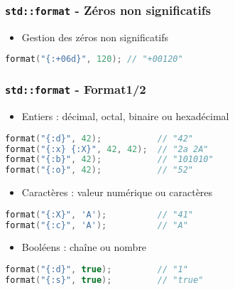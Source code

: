 \documentclass[C++.tex]{subfiles}
\begin{document}
\begin{frame}[fragile]
	\frametitle{\lstinline|std::format| - Zéros non significatifs}
	\begin{itemize}
		\item Gestion des zéros non significatifs
	\end{itemize}

	\begin{lstlisting}[language=C++]
format("{:+06d}", 120);	// "+00120"\end{lstlisting}
\end{frame}

\begin{frame}[fragile]
	\frametitle{\lstinline|std::format| - Format\titlehfill{}1/2}
	\begin{itemize}
		\item Entiers : décimal, octal, binaire ou hexadécimal
	\end{itemize}

	\begin{lstlisting}[language=C++]
format("{:d}", 42);           // "42"
format("{:x} {:X}", 42, 42);  // "2a 2A"
format("{:b}", 42);           // "101010"
format("{:o}", 42);           // "52"\end{lstlisting}

	\begin{itemize}
		\item Caractères : valeur numérique ou caractères
	\end{itemize}

	\begin{lstlisting}[language=C++]
format("{:X}", 'A');          // "41"
format("{:c}", 'A');          // "A"\end{lstlisting}

	\begin{itemize}
		\item Booléens : chaîne ou nombre
	\end{itemize}

	\begin{lstlisting}[language=C++]
format("{:d}", true);         // "1"
format("{:s}", true);         // "true"\end{lstlisting}
\end{frame}
\end{document}
